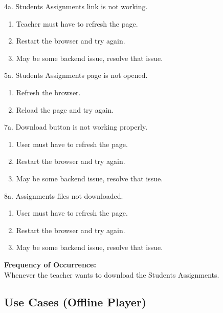\documentclass[12pt]{article}
\begin{document}
4a. Students Assignments link is not working.
\begin{enumerate}
\item Teacher must have to refresh the page.
\item Restart the browser and try again.
\item May be some backend issue, resolve that issue.
\end{enumerate}
5a. Students Assignments page is not opened.
\begin{enumerate}
\item Refresh the browser.
\item Reload the page and try again.
\end{enumerate}
7a. Download button is not working properly.
\begin{enumerate}
\item User must have to refresh the page.
\item Restart the browser and try again.
\item May be some backend issue, resolve that issue.
\end{enumerate}
8a. Assignments files not downloaded.
\begin{enumerate}
\item User must have to refresh the page.
\item Restart the browser and try again.
\item May be some backend issue, resolve that issue.
\end{enumerate}
\textbf{Frequency of Occurrence:}\\
Whenever the teacher wants to download the Students Assignments.

\subsection{Use Cases (Offline Player)}
\end{document}
